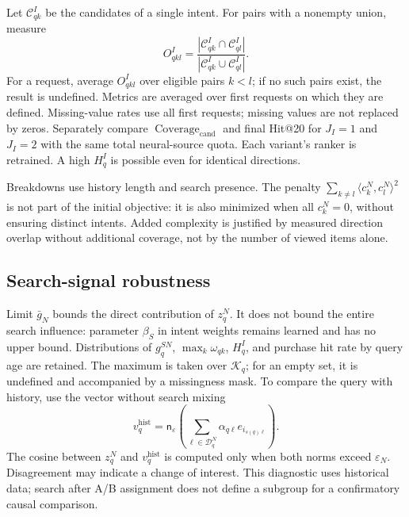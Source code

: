 \documentclass[12pt,a4paper]{article}
\newcommand{\eps}{\varepsilon}
\theoremstyle{plainru}
\begin{document}
Let $\mathcal C_{qk}^I$ be the candidates of a single intent.
For pairs with a nonempty union, measure
\begin{equation}\label{eq:modern-intent-overlap}
O_{qkl}^I=
\frac{|\mathcal C_{qk}^I\cap\mathcal C_{ql}^I|}
{|\mathcal C_{qk}^I\cup\mathcal C_{ql}^I|}.
\end{equation}
For a request, average $O_{qkl}^I$ over eligible pairs $k<l$;
if no such pairs exist, the result is undefined.
Metrics are averaged over first requests on which they are defined.
Missing-value rates use all first requests; missing values are not replaced by zeros.
Separately compare $\operatorname{Coverage}_{\mathrm{cand}}$
and final Hit@20 for $J_I=1$ and $J_I=2$
with the same total neural-source quota.
Each variant's ranker is retrained.
A high $H_q^I$ is possible even for identical directions.

Breakdowns use history length and search presence. The penalty
$\sum_{k\ne l}\langle c_k^N,c_l^N\rangle^2$ is not part of the initial objective:
it is also minimized when all $c_k^N=0$, without ensuring distinct intents.
Added complexity is justified by measured direction overlap
without additional coverage, not by the number of viewed items alone.

\subsection{Search-signal robustness}
\label{sec:modern-search-robustness}

Limit $\bar g_N$ bounds the direct contribution of $z_q^N$.
It does not bound the entire search influence: parameter $\beta_S$
in intent weights remains learned and has no upper bound.
Distributions of $g_q^{SN}$, $\max_k\omega_{qk}$,
$H_q^I$, and purchase hit rate by query age are retained.
The maximum is taken over $\mathcal K_q$; for an empty set,
it is undefined and accompanied by a missingness mask.
To compare the query with history, use the vector without search
mixing
\begin{equation}\label{eq:modern-history-probe}
v_q^{\mathrm{hist}}=
\mathsf n_\eps\!\left(\sum_{\ell\in\mathcal D_q^N}
\alpha_{q\ell}e_{i_{s(q)\ell}}\right).
\end{equation}
The cosine between $z_q^N$ and $v_q^{\mathrm{hist}}$ is computed only
when both norms exceed $\eps_N$. Disagreement may indicate a change of interest. This diagnostic uses historical data;
search after A/B assignment does not define a subgroup
for a confirmatory causal comparison.
\end{document}
